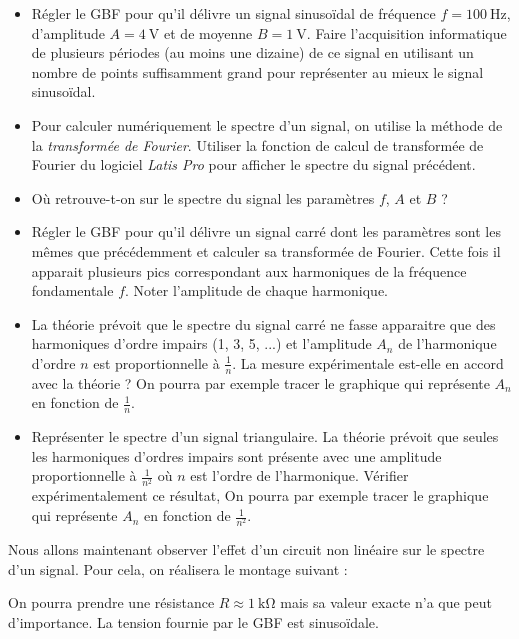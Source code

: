 \documentclass{tp}
\begin{document}
\begin{itemize}
	\item Régler le GBF pour qu'il délivre un signal sinusoïdal de fréquence $f=\SI{100}{\Hz}$, d'amplitude $A=\SI{4}{\V}$ et de moyenne $B=\SI{1}{\V}$. Faire l'acquisition informatique de plusieurs périodes (au moins une dizaine) de ce signal en utilisant un nombre de points suffisamment grand pour représenter au mieux le signal sinusoïdal.

	\item Pour calculer numériquement le spectre d'un signal, on utilise la méthode de la \emph{transformée de Fourier}. Utiliser la fonction de calcul de transformée de Fourier du logiciel \emph{Latis Pro}  pour afficher le spectre du signal précédent.

	\item Où retrouve-t-on sur le spectre du signal les paramètres $f$, $A$ et $B$ ?

	\item Régler le GBF pour qu'il délivre un signal carré dont les paramètres sont les mêmes que précédemment et calculer sa transformée de Fourier. Cette fois il apparait plusieurs pics correspondant aux harmoniques de la fréquence fondamentale $f$. Noter l'amplitude de chaque harmonique. 

	\item La théorie prévoit que le spectre du signal carré ne fasse apparaitre que des harmoniques d'ordre impairs (1, 3, 5, ...) et l'amplitude $A_n$ de l'harmonique d'ordre $n$ est proportionnelle à $\frac1n$. La mesure expérimentale est-elle en accord avec la théorie ? On pourra par exemple tracer le graphique qui représente $A_n$ en fonction de $\frac{1}{n}$. 

	\item Représenter le spectre d'un signal triangulaire. La théorie prévoit que seules les harmoniques d'ordres impairs sont présente avec une amplitude proportionnelle à $\frac{1}{n^2}$ où $n$ est l'ordre de l'harmonique. Vérifier expérimentalement ce résultat, On pourra par exemple tracer le graphique qui représente $A_n$ en fonction de $\frac{1}{n^2}$. 
\end{itemize}

Nous allons maintenant observer l'effet d'un circuit non linéaire sur le spectre d'un signal. Pour cela, on réalisera le montage suivant :
\begin{center}
\end{center}
On pourra prendre une résistance $R\approx \SI{1}{\kilo\ohm}$ mais sa valeur exacte n'a que peut d'importance. La tension fournie par le GBF est sinusoïdale.
\end{document}
